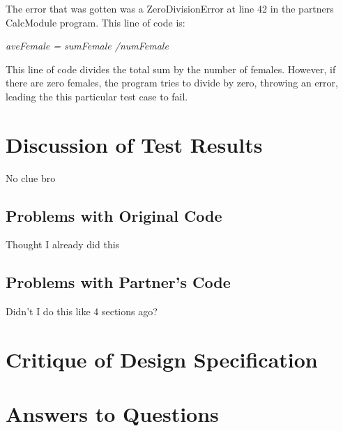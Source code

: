 \documentclass[12pt]{article}
\begin{document}
The error that was gotten was a ZeroDivisionError at line 42 in the partners
CalcModule program. This line of code is:

\centerline{\textit{aveFemale = sumFemale /numFemale}}

This line of code divides the total sum by the number of females. However, if there
are zero females, the program tries to divide by zero, throwing an error, leading
the this particular test case to fail.


\section{Discussion of Test Results}

No clue bro

\subsection{Problems with Original Code}

Thought I already did this

\subsection{Problems with Partner's Code}

Didn't I do this like 4 sections ago?

\section{Critique of Design Specification}



\section{Answers to Questions}
\end{document}
